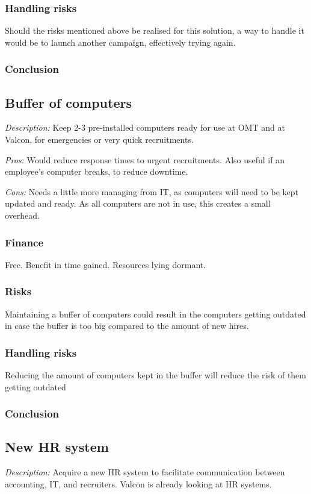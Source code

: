 \subsubsection{Handling risks}
Should the risks mentioned above be realised for this solution, a way to handle it would be to launch another campaign, effectively trying again. 

\subsubsection{Conclusion} 

\subsection{Buffer of computers}
\emph{Description:} Keep 2-3 pre-installed computers ready for use at OMT and at Valcon, for emergencies or very quick recruitments.

\emph{Pros:} Would reduce response times to urgent recruitments.
Also useful if an employee's computer breaks, to reduce downtime.

\emph{Cons:} Needs a little more managing from IT, as
computers will need to be kept updated and ready.
As all computers are not in use, this creates a small overhead.

\subsubsection{Finance} Free. Benefit in time gained. Resources lying dormant.

\subsubsection{Risks}
Maintaining a buffer of computers could result in the computers getting outdated in case the buffer is too big compared to the amount of new hires.

\subsubsection{Handling risks}
Reducing the amount of computers kept in the buffer will reduce the risk of them getting outdated

\subsubsection{Conclusion}

\subsection{New HR system}
\emph{Description:} Acquire a new HR system to facilitate communication between accounting, IT, and recruiters.
Valcon is already looking at HR systems.

